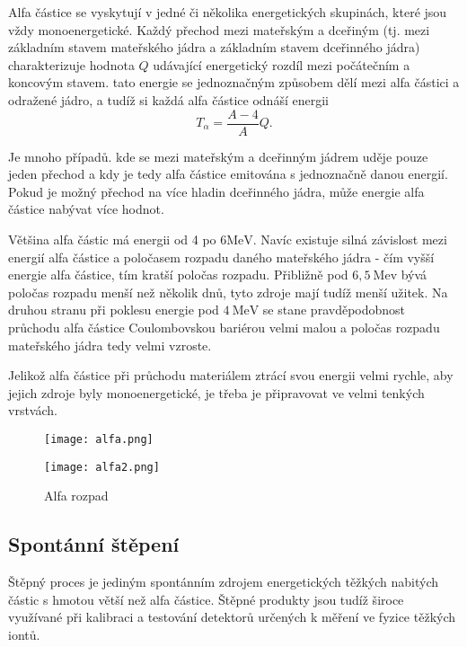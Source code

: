 \documentclass[../../main.tex]{subfiles}
\begin{document}
Alfa částice se vyskytují v jedné či několika energetických skupinách, které jsou vždy monoenergetické. Každý přechod mezi mateřským a dceřiným (tj. mezi základním stavem mateřského jádra a základním stavem dceřinného jádra) charakterizuje hodnota $Q$ udávající energetický rozdíl mezi počátečním a koncovým stavem. tato energie se jednoznačným způsobem dělí mezi alfa částici a odražené jádro, a tudíž si každá alfa částice odnáší energii
\begin{equation}
T_{\alpha} = \dfrac{A-4}{A} Q.
\end{equation} 

Je mnoho případů. kde se mezi mateřským a dceřinným jádrem uděje pouze jeden přechod a kdy je tedy alfa částice emitována s jednoznačně danou energií. Pokud je možný přechod na více hladin dceřinného jádra, může energie alfa částice nabývat více hodnot. 

Většina alfa částic má energii od 4 po 6$\mathrm{MeV}$. Navíc existuje silná závislost mezi energií alfa částice a poločasem rozpadu daného mateřského jádra - čím vyšší energie alfa částice, tím kratší poločas rozpadu. Přibližně pod $6,5 ~\mathrm{Mev}$ bývá poločas rozpadu menší než několik dnů, tyto zdroje mají tudíž menší užitek. Na druhou stranu při poklesu energie pod $4 ~\mathrm{MeV}$ se stane pravděpodobnost průchodu alfa částice Coulombovskou bariérou velmi malou a poločas rozpadu mateřského jádra tedy velmi vzroste. 

Jelikož alfa částice při průchodu materiálem ztrácí svou energii velmi rychle, aby jejich zdroje byly monoenergetické, je třeba je připravovat ve velmi tenkých vrstvách.

\begin{figure}[h!]
	\begin{minipage}[c]{0.55\linewidth}
		\texttt{[image: alfa.png]}
	\end{minipage}
	\hfill
	\begin{minipage}[c]{0.55\linewidth}
		\texttt{[image: alfa2.png]}
	\end{minipage}
	\caption{Alfa rozpad}
\end{figure}

\subsection{Spontánní štěpení}

Štěpný proces je jediným spontánním zdrojem energetických těžkých nabitých částic s hmotou větší než alfa částice. Štěpné produkty jsou tudíž široce využívané při kalibraci a testování detektorů určených k měření ve fyzice těžkých iontů. 
\end{document}
